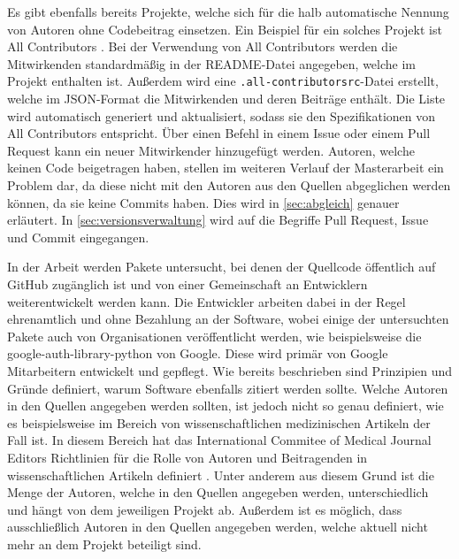 Es gibt ebenfalls bereits Projekte, welche sich für die halb automatische Nennung von Autoren ohne Codebeitrag einsetzen.
Ein Beispiel für ein solches Projekt ist \glqq All Contributors\grqq{} \autocite{bolam_recognize_2024}.
Bei der Verwendung von \glqq All Contributors\grqq{} werden die Mitwirkenden standardmäßig in der README-Datei angegeben, welche im Projekt enthalten ist.
Außerdem wird eine \texttt{.all-contributorsrc}-Datei erstellt, welche im JSON-Format die Mitwirkenden und deren Beiträge enthält.
Die Liste wird automatisch generiert und aktualisiert, sodass sie den Spezifikationen von \glqq All Contributors\grqq{} entspricht.
Über einen Befehl in einem Issue oder einem Pull Request kann ein neuer Mitwirkender hinzugefügt werden.
Autoren, welche keinen Code beigetragen haben, stellen im weiteren Verlauf der Masterarbeit ein Problem dar, da diese nicht mit den Autoren aus den Quellen abgeglichen werden können, da sie keine Commits haben.
Dies wird in \autoref{sec:abgleich} genauer erläutert.
In \autoref{sec:versionsverwaltung} wird auf die Begriffe Pull Request, Issue und Commit eingegangen.

In der Arbeit werden Pakete untersucht, bei denen der Quellcode öffentlich auf GitHub zugänglich ist und von einer Gemeinschaft an Entwicklern weiterentwickelt werden kann.
Die Entwickler arbeiten dabei in der Regel ehrenamtlich und ohne Bezahlung an der Software, wobei einige der untersuchten Pakete auch von Organisationen veröffentlicht werden, wie beispielsweise die \glqq google-auth-library-python
\grqq{} von Google.
Diese wird primär von Google Mitarbeitern entwickelt und gepflegt.
Wie bereits beschrieben sind Prinzipien und Gründe definiert, warum Software ebenfalls zitiert werden sollte.
Welche Autoren in den Quellen angegeben werden sollten, ist jedoch nicht so genau definiert, wie es beispielsweise im Bereich von wissenschaftlichen medizinischen Artikeln der Fall ist.
In diesem Bereich hat das \glqq International Commitee of Medical Journal Editors\grqq{} Richtlinien für die Rolle von Autoren und Beitragenden in wissenschaftlichen Artikeln definiert \autocite{icmje_icmje_2024}.
Unter anderem aus diesem Grund ist die Menge der Autoren, welche in den Quellen angegeben werden, unterschiedlich und hängt von dem jeweiligen Projekt ab.
Außerdem ist es möglich, dass ausschließlich Autoren in den Quellen angegeben werden, welche aktuell nicht mehr an dem Projekt beteiligt sind.
